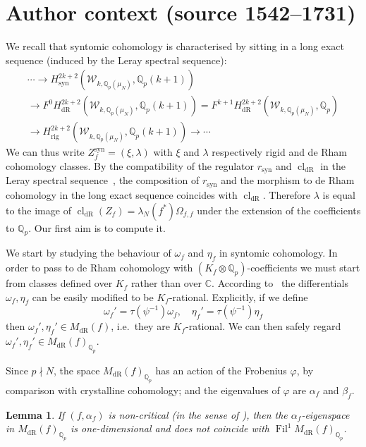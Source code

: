 \documentclass[10pt,a4paper]{amsart}
\newtheorem{lemma}{Lemma}
\newcommand{\KS}{\mathscr{W}}
\newcommand{\regulator}[1]{r_{#1}}
\newcommand{\rsyn}{\regulator{\syn}}
\DeclareMathOperator{\syn}{syn}
\newcommand{\C}{\numberset{C}}
\DeclareMathOperator{\Fil}{Fil}
\newcommand{\Q}{\numberset{Q}}
\DeclareMathOperator{\cl}{cl}
\DeclareMathOperator{\dR}{dR}
\DeclareMathOperator{\rig}{rig}
\newcommand{\numberset}{\mathbb}
\begin{document}
\section*{Author context (source 1542--1731)}
  We recall that syntomic cohomology is characterised by sitting in a long exact sequence (induced by the Leray spectral sequence):
  \begin{multline*}
      \cdots \to H_{\syn}^{2k+2}(\KS_{k,\Q_p(\mu_N)},\Q_p(k+1)) \\
      \to F^0 H_{\dR}^{2k+2}(\KS_{k,\Q_p(\mu_N)},\Q_p(k+1)) = F^{k+1} H_{\dR}^{2k+2}(\KS_{k,\Q_p(\mu_N)},\Q_p) \\
      \to H_{\rig}^{2k+2}(\KS_{k,\Q_p(\mu_N)},\Q_p(k+1)) \to \cdots
  \end{multline*}
  We can thus write $Z_f^{\syn} = (\xi,\lambda)$ with $\xi$ and $\lambda$ respectively rigid and de Rham cohomology classes. By the compatibility of the regulator $\rsyn$ and $\cl_{\dR}$ in the Leray spectral sequence~\cite[Theorem~7.5]{besser00}, the composition of $\rsyn$ and the morphism to de Rham cohomology in the long exact sequence coincides with $\cl_{\dR}$. Therefore $\lambda$ is equal to the image of $\cl_{\dR}(Z_f) = \lambda_N(f^*)\Omega_{f,f}$ under the extension of the coefficients to $\Q_p$. Our first aim is to compute it.

  We start by studying the behaviour of $\omega_f$ and $\eta_f$ in syntomic cohomology. In order to pass to de Rham cohomology with $(K_f\otimes\Q_p)$-coefficients we must start from classes defined over $K_f$ rather than over $\C$. According to~\cite[§6.1]{KLZ17} the differentials $\omega_f, \eta_f$ can be easily modified to be $K_f$-rational. Explicitly, if we define
  \[
      \omega_f' = \tau(\psi^{-1})\omega_f, \quad \eta_f' = \tau(\psi^{-1})\eta_f
  \]
  then $\omega_f', \eta_f' \in M_{\dR}(f)$, i.e.\ they are $K_f$-rational. We can then safely regard $\omega_f', \eta_f' \in M_{\dR}(f)_{\Q_p}$. 
  
  Since $p \nmid N$, the space $M_{\dR}(f)_{\Q_p}$ has an action of the Frobenius $\varphi$, by comparison with crystalline cohomology; and the eigenvalues of $\varphi$ are $\alpha_f$ and $\beta_f$.

  \begin{lemma}
   \label{lemma:frobenius-eigenspaces}
   If $(f, \alpha_f)$ is non-critical (in the sense of ), then the $\alpha_f$-eigenspace in $M_{\dR}(f)_{\Q_p}$ is one-dimensional and does not coincide with $\Fil^1 M_{\dR}(f)_{\Q_p}$.
  \end{lemma}
\end{document}
